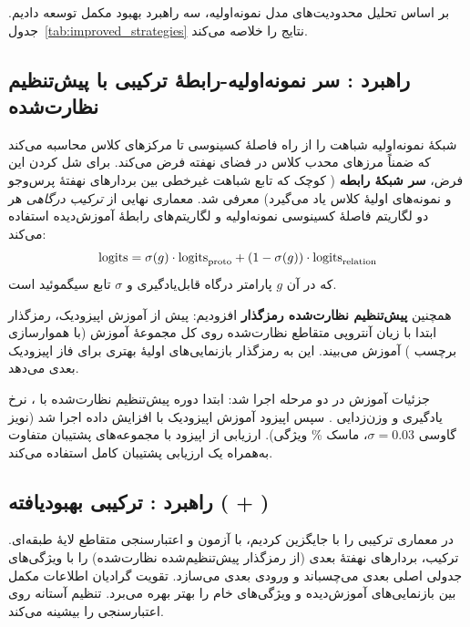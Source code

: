 بر اساس تحلیل محدودیت‌های مدل نمونه‌اولیه، سه راهبرد بهبود مکمل توسعه دادیم. جدول~\ref{tab:improved_strategies} نتایج را خلاصه می‌کند.

\subsection{راهبرد : سر نمونه‌اولیه-رابطۀ ترکیبی با پیش‌تنظیم نظارت‌شده}

شبکۀ نمونه‌اولیه شباهت را از راه فاصلۀ کسینوسی تا مرکزهای کلاس محاسبه می‌کند که ضمناً مرزهای محدب کلاس در فضای نهفته فرض می‌کند. برای شل کردن این فرض، \textbf{سر شبکۀ رابطه} ( کوچک که تابع شباهت غیرخطی بین بردارهای نهفتۀ پرس‌وجو و نمونه‌های اولیۀ کلاس یاد می‌گیرد) معرفی شد. معماری نهایی از \textit{ترکیب درگاهی} هر دو لگاریتم فاصلۀ کسینوسی نمونه‌اولیه و لگاریتم‌های رابطۀ آموزش‌دیده استفاده می‌کند:
\begin{equation}
\text{logits} = \sigma(g) \cdot \text{logits}_{\text{proto}} + (1 - \sigma(g)) \cdot \text{logits}_{\text{relation}}
\end{equation}
که در آن $g$ پارامتر درگاه قابل‌یادگیری و $\sigma$ تابع سیگموئید است.

همچنین \textbf{پیش‌تنظیم نظارت‌شده رمزگذار} افزودیم: پیش از آموزش اپیزودیک، رمزگذار  ابتدا با زیان آنتروپی متقاطع نظارت‌شده روی کل مجموعۀ آموزش (با هموارسازی برچسب ) آموزش می‌بیند. این به رمزگذار بازنمایی‌های اولیۀ بهتری برای فاز اپیزودیک بعدی می‌دهد.

جزئیات آموزش در دو مرحله اجرا شد: ابتدا  دوره پیش‌تنظیم نظارت‌شده با ، نرخ یادگیری  و وزن‌زدایی . سپس  اپیزود آموزش اپیزودیک با افزایش داده اجرا شد (نویز گاوسی $\sigma=0.03$، ماسک \% ویژگی). ارزیابی از   اپیزود با مجموعه‌های پشتیبان متفاوت به‌همراه یک ارزیابی پشتیبان کامل استفاده می‌کند.

\subsection{راهبرد : ترکیبی بهبودیافته ( + )}

 در معماری ترکیبی را با  جایگزین کردیم، با   آزمون و اعتبارسنجی متقاطع ‌لایۀ طبقه‌ای. ترکیب، بردارهای نهفتۀ بعدی  (از رمزگذار پیش‌تنظیم‌شده نظارت‌شده) را با ویژگی‌های جدولی اصلی بعدی می‌چسباند و ورودی بعدی می‌سازد. تقویت گرادیان  اطلاعات مکمل بین بازنمایی‌های آموزش‌دیده و ویژگی‌های خام را بهتر بهره می‌برد. تنظیم آستانه روی اعتبارسنجی  را بیشینه می‌کند.

